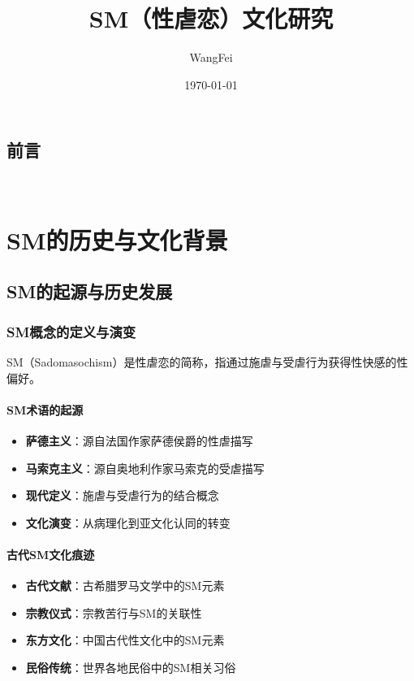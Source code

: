 \documentclass[12pt,UTF8]{ctexbook}
\title{\heiti\zihao{0} SM（性虐恋）文化研究}
\author{WangFei}
\date{\today}
\begin{document}
\maketitle
\tableofcontents

\frontmatter
\chapter{前言}

\mainmatter

~\\

\newcommand{\khfk}{\raisebox{0.8ex}{\framebox[0.6em][c]{}}}

\newcommand{\khfks}[1]{%
  \ifnum#1>0%
    \khfk%
    \ifnum#1>1\,\fi%
    \khfks{\numexpr#1-1\relax}%
  \fi%
}

\part{SM的历史与文化背景}

\chapter{SM的起源与历史发展}
\section{SM概念的定义与演变}
SM（Sadomasochism）是性虐恋的简称，指通过施虐与受虐行为获得性快感的性偏好。

\subsection{SM术语的起源}
\begin{itemize}[leftmargin=2cm]
	\item \textbf{萨德主义}：源自法国作家萨德侯爵的性虐描写
	\item \textbf{马索克主义}：源自奥地利作家马索克的受虐描写
	\item \textbf{现代定义}：施虐与受虐行为的结合概念
	\item \textbf{文化演变}：从病理化到亚文化认同的转变
\end{itemize}

\subsection{古代SM文化痕迹}
\begin{itemize}[leftmargin=2cm]
	\item \textbf{古代文献}：古希腊罗马文学中的SM元素
	\item \textbf{宗教仪式}：宗教苦行与SM的关联性
	\item \textbf{东方文化}：中国古代性文化中的SM元素
	\item \textbf{民俗传统}：世界各地民俗中的SM相关习俗
\end{itemize}
\end{document}
